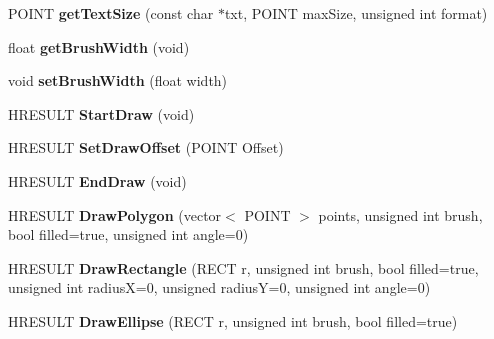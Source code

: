 \begin{DoxyCompactItemize}
\item 
\hypertarget{class_engine_g_u_i_a98e705c23362e954755a7a9fb12d3b86}{P\-O\-I\-N\-T {\bfseries get\-Text\-Size} (const char $\ast$txt, P\-O\-I\-N\-T max\-Size, unsigned int format)}\label{class_engine_g_u_i_a98e705c23362e954755a7a9fb12d3b86}

\item 
\hypertarget{class_engine_g_u_i_a71abc09dfd4373f53a016b81d319b92b}{float {\bfseries get\-Brush\-Width} (void)}\label{class_engine_g_u_i_a71abc09dfd4373f53a016b81d319b92b}

\item 
\hypertarget{class_engine_g_u_i_aaa64bbc11cdf3ab5d5a636a1b1bf980e}{void {\bfseries set\-Brush\-Width} (float width)}\label{class_engine_g_u_i_aaa64bbc11cdf3ab5d5a636a1b1bf980e}

\item 
\hypertarget{class_engine_g_u_i_a5ce45d5f8bc98b30cccfd6d8fda686b1}{H\-R\-E\-S\-U\-L\-T {\bfseries Start\-Draw} (void)}\label{class_engine_g_u_i_a5ce45d5f8bc98b30cccfd6d8fda686b1}

\item 
\hypertarget{class_engine_g_u_i_a0cfff89732e8355a7e3ab25e7535fc58}{H\-R\-E\-S\-U\-L\-T {\bfseries Set\-Draw\-Offset} (P\-O\-I\-N\-T Offset)}\label{class_engine_g_u_i_a0cfff89732e8355a7e3ab25e7535fc58}

\item 
\hypertarget{class_engine_g_u_i_a8af860f8f34608642f032a3a9cd3765e}{H\-R\-E\-S\-U\-L\-T {\bfseries End\-Draw} (void)}\label{class_engine_g_u_i_a8af860f8f34608642f032a3a9cd3765e}

\item 
\hypertarget{class_engine_g_u_i_ae11c7743eeddb2db6cf9edf0f992118d}{H\-R\-E\-S\-U\-L\-T {\bfseries Draw\-Polygon} (vector$<$ P\-O\-I\-N\-T $>$ points, unsigned int brush, bool filled=true, unsigned int angle=0)}\label{class_engine_g_u_i_ae11c7743eeddb2db6cf9edf0f992118d}

\item 
\hypertarget{class_engine_g_u_i_a2cf65649bb05b1d2edd755a84bee8355}{H\-R\-E\-S\-U\-L\-T {\bfseries Draw\-Rectangle} (R\-E\-C\-T r, unsigned int brush, bool filled=true, unsigned int radius\-X=0, unsigned radius\-Y=0, unsigned int angle=0)}\label{class_engine_g_u_i_a2cf65649bb05b1d2edd755a84bee8355}

\item 
\hypertarget{class_engine_g_u_i_ab12a7539faa6a7ba9dcc50e007fba3d5}{H\-R\-E\-S\-U\-L\-T {\bfseries Draw\-Ellipse} (R\-E\-C\-T r, unsigned int brush, bool filled=true)}\label{class_engine_g_u_i_ab12a7539faa6a7ba9dcc50e007fba3d5}


\end{DoxyCompactItemize}
